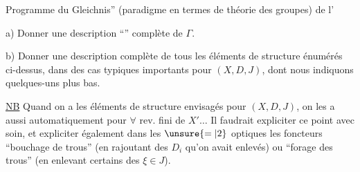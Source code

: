Programme du   Gleichnis'' (paradigme en termes de théorie des groupes) de l'

a) Donner une description ``'' complète de $\Gamma$.

b) Donner une description complète de tous les éléments de structure énumérés ci-dessus, dans des cas typiques importants pour $(X,D,J)$, dont nous indiquons quelques-uns plus bas.


\uline{NB} Quand on a les éléments de structure envisagés pour $(X,D,J)$, on les a aussi automatiquement pour $\forall$ rev. fini de $X'\ldots$ Il faudrait expliciter ce point avec soin, et expliciter également dans les $\unsure{=|2}$ optiques les foncteurs ``bouchage de trous'' (en rajoutant  des $D_i$ qu'on avait enlevés) ou ``forage des trous''  (en enlevant certains des $\xi\in J$).

